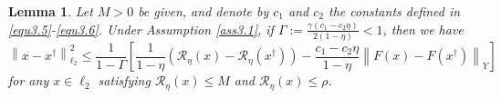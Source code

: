 \documentclass[a4paper,12pt]{article}
\newtheorem{lemma}[theorem]{Lemma}
\numberwithin{equation}{section}
\begin{document}
\begin{lemma}\label{lem3.4}
    Let $M>0$ be given, and denote by $c_{1}$ and $c_{2}$ the constants defined in \eqref{equ3.5}-\eqref{equ3.6}. Under Assumption \ref{ass3.1}, if $\Gamma:=\frac{\gamma \left(c_{1}-c_{2}\eta\right)}{2\left(1-\eta\right)}<1$, then we have
    \begin{equation*}
        \left\|x-x^{\dagger}\right\|_{\ell_{2}}^{2}\leq \frac{1}{1-\Gamma} \left[\frac{1}{1-\eta}\left(\mathcal{R}_{\eta}\left(x\right)- \mathcal{R}_{\eta}\left(x^{\dagger}\right)\right)-\frac{c_{1}-c_{2}\eta} {1-\eta}\left\|F\left(x\right)- F\left(x^{\dagger}\right)\right\|_{Y}\right]
    \end{equation*}
    for any $x\in\ell_{2}$ satisfying $\mathcal{R}_{\eta}\left(x\right)\leq M$ and $\mathcal{R}_{\eta}\left(x\right)\leq \rho$.
\end{lemma}
\end{document}
